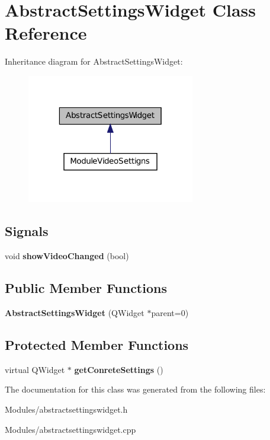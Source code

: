 \hypertarget{class_abstract_settings_widget}{
\section{AbstractSettingsWidget Class Reference}
\label{db/dcb/class_abstract_settings_widget}
}


Inheritance diagram for AbstractSettingsWidget:\nopagebreak
\begin{figure}[H]
\begin{center}
\leavevmode
\includegraphics[width=208pt]{db/de4/class_abstract_settings_widget__inherit__graph}
\end{center}
\end{figure}
\subsection*{Signals}
\begin{DoxyCompactItemize}
\item 
\hypertarget{class_abstract_settings_widget_a1f1f041ffe91ad92284eda558f011a39}{
void {\bfseries showVideoChanged} (bool)}
\label{db/dcb/class_abstract_settings_widget_a1f1f041ffe91ad92284eda558f011a39}

\end{DoxyCompactItemize}
\subsection*{Public Member Functions}
\begin{DoxyCompactItemize}
\item 
\hypertarget{class_abstract_settings_widget_ae1febbb1cfae0f5e21fb2ab86d301211}{
{\bfseries AbstractSettingsWidget} (QWidget $\ast$parent=0)}
\label{db/dcb/class_abstract_settings_widget_ae1febbb1cfae0f5e21fb2ab86d301211}

\end{DoxyCompactItemize}
\subsection*{Protected Member Functions}
\begin{DoxyCompactItemize}
\item 
\hypertarget{class_abstract_settings_widget_a9b53233f9893f914da8b70fa30ccf476}{
virtual QWidget $\ast$ {\bfseries getConreteSettings} ()}
\label{db/dcb/class_abstract_settings_widget_a9b53233f9893f914da8b70fa30ccf476}

\end{DoxyCompactItemize}


The documentation for this class was generated from the following files:\begin{DoxyCompactItemize}
\item 
Modules/abstractsettingswidget.h\item 
Modules/abstractsettingswidget.cpp\end{DoxyCompactItemize}
